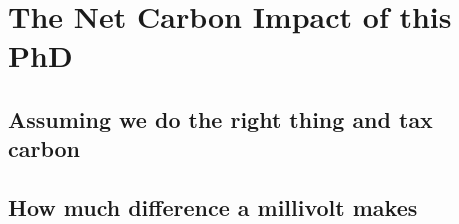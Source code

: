 

\chapter{The Net Carbon Impact of this PhD}\label{ch:impact}

\section{Assuming we do the right thing and tax carbon}
\section{How much difference a millivolt makes}